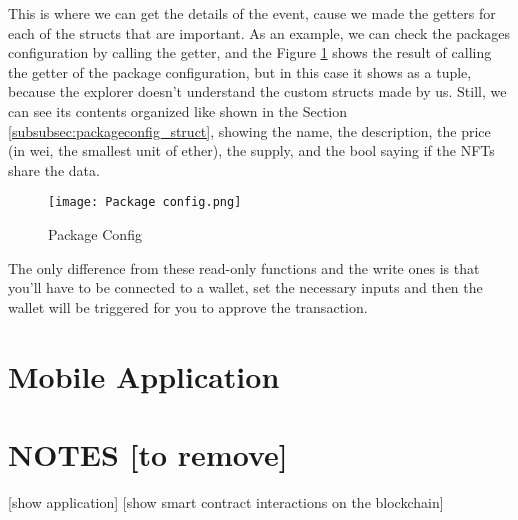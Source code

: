 This is where we can get the details of the event, cause we made the getters for each of the structs that are important. As an example, we can check the packages configuration by calling the getter, and the Figure \ref{fig:package_config} shows the result of calling the getter of the package configuration, but in this case it shows as a tuple, because the explorer doesn't understand the custom structs made by us. Still, we can see its contents organized like shown in the Section \ref{subsubsec:packageconfig_struct}, showing the name, the description, the price (in wei, the smallest unit of ether), the supply, and the bool saying if the NFTs share the data.

\begin{figure}[H]
    \texttt{[image: Package config.png]}
    \centering
    \caption{Package Config}
    \label{fig:package_config}
\end{figure}

The only difference from these read-only functions and the write ones is that you'll have to be connected to a wallet, set the necessary inputs and then the wallet will be triggered for you to approve the transaction.

\section{Mobile Application}
\label{sec:mobile_application}

\section{NOTES [to remove]}

 [show application]
 [show smart contract interactions on the blockchain]